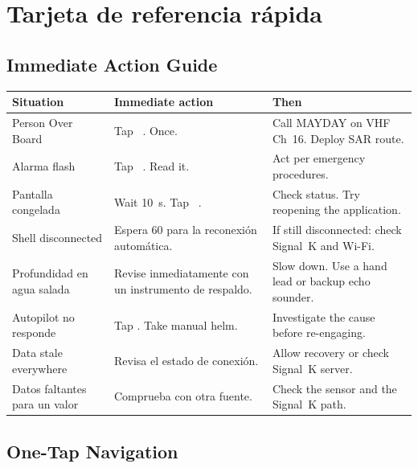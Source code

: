 \chapter{Tarjeta de referencia rápida}
\label{ch:quickref}

\section*{Immediate Action Guide}

\begin{longtable}{L{3.6cm}L{4.4cm}L{5.7cm}}
\toprule
{}
\color{white}\sffamily\bfseries Situation &
\color{white}\sffamily\bfseries Immediate action &
\color{white}\sffamily\bfseries Then \\
\midrule
Person Over Board&
  Tap ~. Once. &
  Call MAYDAY on VHF Ch~16. Deploy SAR route. \\
Alarma flash&
  Tap ~. Read it. &
  Act per emergency procedures. \\
Pantalla congelada&
  Wait 10~s. Tap ~. &
  Check status. Try reopening the application. \\
Shell disconnected&
Espera 60 para la reconexión automática.&
  If still disconnected: check Signal~K and Wi-Fi. \\
Profundidad en agua salada&
Revise inmediatamente con un instrumento de respaldo.&
  Slow down. Use a hand lead or backup echo sounder. \\
Autopilot no responde&
  Tap . Take manual helm. &
  Investigate the cause before re-engaging. \\
Data stale everywhere&
Revisa el estado de conexión.&
  Allow recovery or check Signal~K server. \\
Datos faltantes para un valor&
Comprueba con otra fuente.&
  Check the sensor and the Signal~K path. \\
\bottomrule
\end{longtable}

\section*{One-Tap Navigation}

